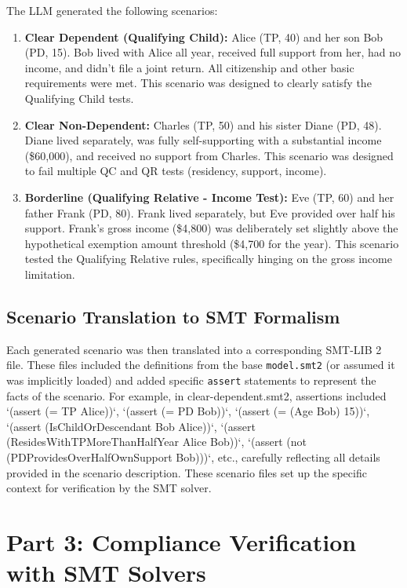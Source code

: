 \documentclass[11pt, letterpaper]{article}
\begin{document}
The LLM generated the following scenarios:
\begin{enumerate}[label=\textbf{Scenario \arabic*:}, wide, labelwidth=!, labelindent=0pt]
    \item \textbf{Clear Dependent (Qualifying Child):} Alice (TP, 40) and her son Bob (PD, 15). Bob lived with Alice all year, received full support from her, had no income, and didn't file a joint return. All citizenship and other basic requirements were met. This scenario was designed to clearly satisfy the Qualifying Child tests.
    \item \textbf{Clear Non-Dependent:} Charles (TP, 50) and his sister Diane (PD, 48). Diane lived separately, was fully self-supporting with a substantial income (\$60,000), and received no support from Charles. This scenario was designed to fail multiple QC and QR tests (residency, support, income).
    \item \textbf{Borderline (Qualifying Relative - Income Test):} Eve (TP, 60) and her father Frank (PD, 80). Frank lived separately, but Eve provided over half his support. Frank's gross income (\$4,800) was deliberately set slightly above the hypothetical exemption amount threshold (\$4,700 for the year). This scenario tested the Qualifying Relative rules, specifically hinging on the gross income limitation.
\end{enumerate}

\subsection{Scenario Translation to SMT Formalism}

Each generated scenario was then translated into a corresponding SMT-LIB 2 file. These files included the definitions from the base \texttt{model.smt2} (or assumed it was implicitly loaded) and added specific \texttt{assert} statements to represent the facts of the scenario. For example, in clear-dependent.smt2, assertions included `(assert (= TP Alice))`, `(assert (= PD Bob))`, `(assert (= (Age Bob) 15))`, `(assert (IsChildOrDescendant Bob Alice))`, `(assert (ResidesWithTPMoreThanHalfYear Alice Bob))`, `(assert (not (PDProvidesOverHalfOwnSupport Bob)))`, etc., carefully reflecting all details provided in the scenario description. These scenario files set up the specific context for verification by the SMT solver.

\section{Part 3: Compliance Verification with SMT Solvers}
\end{document}
